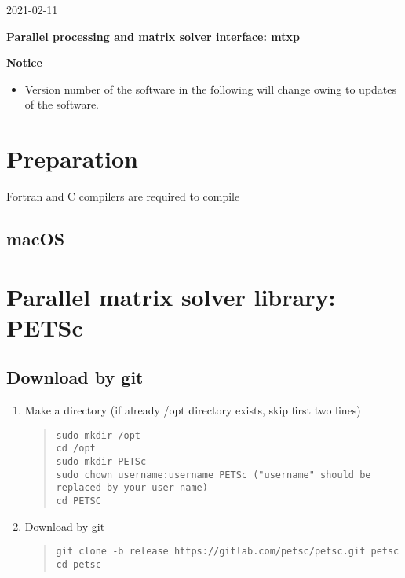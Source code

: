 \documentclass[11pt]{article}
\begin{document}
\begin{flushright}
2021-02-11
\end{flushright}

\begin{center}
{\Large \bf Parallel processing and matrix solver interface: mtxp}
\end{center}

\tableofcontents

\bigskip
\begin{center}
\textbf{Notice}
\end{center}
\begin{itemize}
\item
Version number of the software in the following will change owing to
updates of the software.
\end{itemize}
\bigskip

\section{Preparation}

Fortran and C compilers are required to compile 

\subsection{macOS}


\section{Parallel matrix solver library: PETSc}

\subsection{Download by git}

\begin{enumerate}
\item
Make a directory (if already /opt directory exists, skip first two lines)
\begin{quote}
\begin{verbatim}
sudo mkdir /opt
cd /opt
sudo mkdir PETSc
sudo chown username:username PETSc ("username" should be replaced by your user name)
cd PETSC
\end{verbatim}
\end{quote}
\item
  Download by git
\begin{quote}
\begin{verbatim}
git clone -b release https://gitlab.com/petsc/petsc.git petsc
cd petsc
\end{verbatim}
\end{quote}
\end{enumerate}
\end{document}
